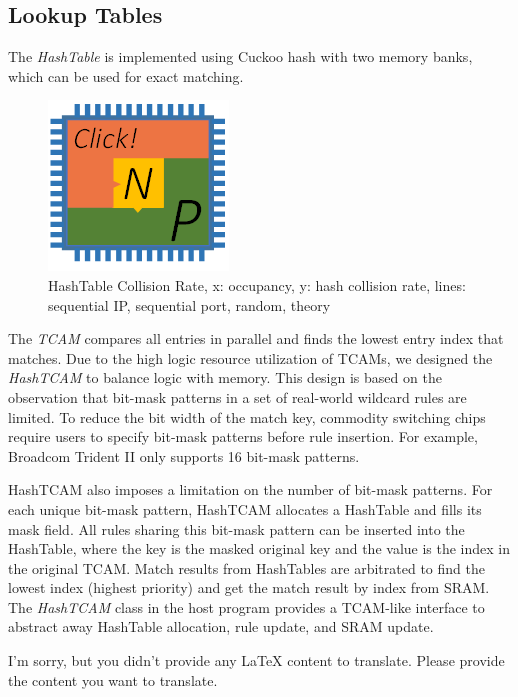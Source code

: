 \subsection{Lookup Tables}
\label{clicknp:subsec:lookuptables}

The \textit{HashTable} is implemented using Cuckoo hash \cite{pagh2004cuckoo} with two memory banks, which can be used for exact matching.

\begin{figure}[h!]
	\centering
	\includegraphics[width=0.6\columnwidth]{image/logo}
	\vspace{-0.15in}
	\caption{HashTable Collision Rate, x: occupancy, y: hash collision rate, lines: sequential IP, sequential port, random, theory}
	\vspace{-0.15in}
	\label{clicknp:fig:HashTableCollisionRate}
\end{figure}

The \textit{TCAM} compares all entries in parallel and finds the lowest entry index that matches. Due to the high logic resource utilization of TCAMs, we designed the \textit{HashTCAM} to balance logic with memory. This design is based on the observation that bit-mask patterns in a set of real-world wildcard rules are limited. To reduce the bit width of the match key, commodity switching chips require users to specify bit-mask patterns before rule insertion. For example, Broadcom Trident II \cite{broadcomethernet} only supports 16 bit-mask patterns.

HashTCAM also imposes a limitation on the number of bit-mask patterns. For each unique bit-mask pattern, HashTCAM allocates a HashTable and fills its mask field. All rules sharing this bit-mask pattern can be inserted into the HashTable, where the key is the masked original key and the value is the index in the original TCAM. Match results from HashTables are arbitrated to find the lowest index (highest priority) and get the match result by index from SRAM. The \textit{HashTCAM} class in the host program provides a TCAM-like interface to abstract away HashTable allocation, rule update, and SRAM update.

I'm sorry, but you didn't provide any LaTeX content to translate. Please provide the content you want to translate.
